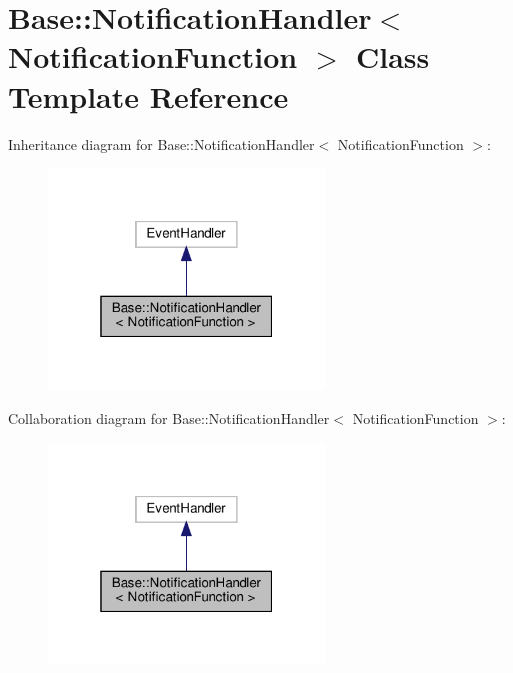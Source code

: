 \hypertarget{class_base_1_1_notification_handler}{}\section{Base\+:\+:Notification\+Handler$<$ Notification\+Function $>$ Class Template Reference}
\label{class_base_1_1_notification_handler}


Inheritance diagram for Base\+:\+:Notification\+Handler$<$ Notification\+Function $>$\+:
\nopagebreak
\begin{figure}[H]
\begin{center}
\leavevmode
\includegraphics[width=208pt]{class_base_1_1_notification_handler__inherit__graph}
\end{center}
\end{figure}


Collaboration diagram for Base\+:\+:Notification\+Handler$<$ Notification\+Function $>$\+:
\nopagebreak
\begin{figure}[H]
\begin{center}
\leavevmode
\includegraphics[width=208pt]{class_base_1_1_notification_handler__coll__graph}
\end{center}
\end{figure}

